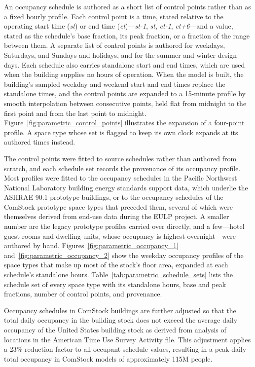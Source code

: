 An occupancy schedule is authored as a short list of control points rather than as a fixed hourly profile. Each control point is a time, stated relative to the operating start time (\emph{st}) or end time (\emph{et})---\emph{st-1}, \emph{st}, \emph{et-1}, \emph{et+6}---and a value, stated as the schedule's base fraction, its peak fraction, or a fraction of the range between them. A separate list of control points is authored for weekdays, Saturdays, and Sundays and holidays, and for the summer and winter design days. Each schedule also carries standalone start and end times, which are used when the building supplies no hours of operation. When the model is built, the building's sampled weekday and weekend start and end times replace the standalone times, and the control points are expanded to a 15-minute profile by smooth interpolation between consecutive points, held flat from midnight to the first point and from the last point to midnight. Figure~\ref{fig:parametric_control_points} illustrates the expansion of a four-point profile. A space type whose set is flagged to keep its own clock expands at its authored times instead.

The control points were fitted to source schedules rather than authored from scratch, and each schedule set records the provenance of its occupancy profile. Most profiles were fitted to the occupancy schedules in the Pacific Northwest National Laboratory building energy standards support data, which underlie the ASHRAE 90.1 prototype buildings, or to the occupancy schedules of the ComStock prototype space types that preceded them, several of which were themselves derived from end-use data during the EULP project. A smaller number are the legacy prototype profiles carried over directly, and a few---hotel guest rooms and dwelling units, whose occupancy is highest overnight---were authored by hand. Figures~\ref{fig:parametric_occupancy_1} and~\ref{fig:parametric_occupancy_2} show the weekday occupancy profiles of the space types that make up most of the stock's floor area, expanded at each schedule's standalone hours. Table~\ref{tab:parametric_schedule_sets} lists the schedule set of every space type with its standalone hours, base and peak fractions, number of control points, and provenance.

Occupancy schedules in ComStock buildings are further adjusted so that the total daily occupancy in the building stock does not exceed the average daily occupancy of the United States building stock as derived from analysis of locations in the American Time Use Survey \citep{atus2018} Activity file. This adjustment applies a 23\% reduction factor to all occupant schedule values, resulting in a peak daily total occupancy in ComStock models of approximately 115M people.

